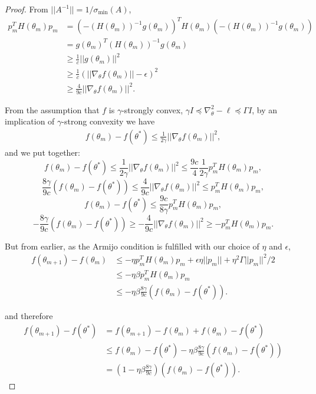 \begin{proof}
From $||A^{-1}|| = 1/\sigma_{\min}(A)$,
\begin{align}
    p_m^TH(\theta_m)p_m &= (-(H(\theta_m))^{-1}g(\theta_m))^TH(\theta_m)(-(H(\theta_m))^{-1}g(\theta_m)) \\
    &= g(\theta_m)^T(H(\theta_m))^{-1}g(\theta_m) \\
    &\geq \frac{1}{c}||g(\theta_m)||^2 \\
    &\geq \frac{1}{c}(||\nabla_\theta f(\theta_m)|| - \epsilon)^2 \\
    &\geq \frac{4}{9c}||\nabla_\theta f(\theta_m)||^2.
\end{align}

From the assumption that $f$ is $\gamma$-strongly convex, $\gamma I \preceq \nabla_\theta^2 -\ell \preceq \Gamma I$, by an implication of $\gamma$-strong convexity we have
\begin{align}
    f(\theta_m) - f(\theta^*) \leq \frac{1}{2\gamma}||\nabla_\theta f(\theta_m)||^2,
\end{align}
and we put together:
\begin{equation}
    f(\theta_m) - f(\theta^*) \leq \frac{1}{2\gamma}||\nabla_\theta f(\theta_m)||^2 \leq \frac{9c}{4}\frac{1}{2\gamma}p_m^TH(\theta_m)p_m,
\end{equation}
\begin{equation}
    \frac{8\gamma}{9c}(f(\theta_m) - f(\theta^*)) \leq \frac{4}{9c}||\nabla_\theta f(\theta_m)||^2 \leq p_m^TH(\theta_m)p_m,
\end{equation}
\begin{equation}
    f(\theta_m) - f(\theta^*) \leq \frac{9c}{8\gamma}p_m^TH(\theta_m)p_m,
\end{equation}
\begin{equation}
    -\frac{8\gamma}{9c}(f(\theta_m) - f(\theta^*)) \geq -\frac{4}{9c}||\nabla_\theta f(\theta_m)||^2 \geq -p_m^TH(\theta_m)p_m.
\end{equation}

But from earlier, as the Armijo condition is fulfilled with our choice of $\eta$ and $\epsilon$,
\begin{align}
    f(\theta_{m+1})-f(\theta_m) &\leq -\eta p_m^TH(\theta_m)p_m + \epsilon\eta||p_m|| + \eta^2 \Gamma ||p_m||^2 / 2 \\
    &\leq -\eta\beta p_m^TH(\theta_m)p_m \\
    &\leq -\eta\beta\frac{8\gamma}{9c}(f(\theta_m) - f(\theta^*)).
\end{align}

and therefore
\begin{align}
    f(\theta_{m+1}) - f(\theta^*) 
    &= f(\theta_{m+1})-f(\theta_m)+f(\theta_m)- f(\theta^*) \\
    &\leq f(\theta_m)- f(\theta^*) -\eta\beta\frac{8\gamma}{9c}(f(\theta_m) - f(\theta^*)) \\
    &= (1-\eta\beta\frac{8\gamma}{9c})(f(\theta_m) - f(\theta^*)).
\end{align}

\end{proof}
